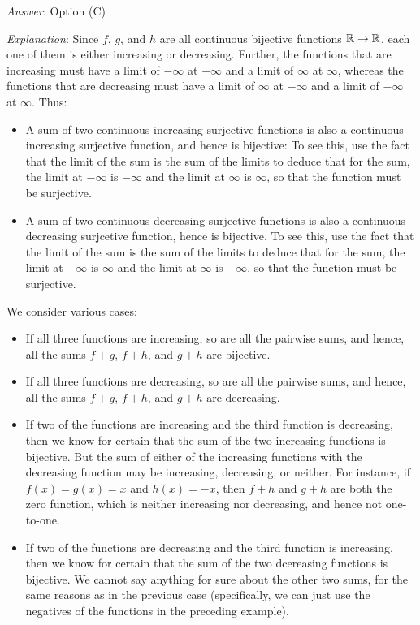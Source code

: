 \documentclass[10pt]{amsart}
\begin{document}
\begin{enumerate}
  {\em Answer}: Option (C)

  {\em Explanation}: Since $f$, $g$, and $h$ are all continuous
  bijective functions $\mathbb{R} \to \mathbb{R}$, each one of them is either
  increasing or decreasing. Further, the functions that are increasing
  must have a limit of $-\infty$ at $-\infty$ and a limit of $\infty$
  at $\infty$, whereas the functions that are decreasing must have a
  limit of $\infty$ at $-\infty$ and a limit of $-\infty$ at
  $\infty$. Thus:

  \begin{itemize}
  \item A sum of two continuous increasing surjective functions is
    also a continuous increasing surjective function, and hence is
    bijective: To see this, use the fact that the limit of the sum is
    the sum of the limits to deduce that for the sum, the limit at
    $-\infty$ is $-\infty$ and the limit at $\infty$ is $\infty$, so
    that the function must be surjective.
  \item A sum of two continuous decreasing surjective functions is
    also a continuous decreasing surjcetive function, hence is
    bijective. To see this, use the fact that the limit of the sum is
    the sum of the limits to deduce that for the sum, the limit at
    $-\infty$ is $\infty$ and the limit at $\infty$ is $-\infty$, so
    that the function must be surjective.
  \end{itemize}

  We consider various cases:

  \begin{itemize}
  \item If all three functions are increasing, so are all the pairwise
    sums, and hence, all the sums $f + g$, $f + h$, and $g + h$ are
    bijective.
  \item If all three functions are decreasing, so are all the pairwise
    sums, and hence, all the sums $f + g$, $f + h$, and $g + h$ are
    decreasing.
  \item If two of the functions are increasing and the third function
    is decreasing, then we know for certain that the sum of the two
    increasing functions is bijective. But the sum of either of the
    increasing functions with the decreasing function may be
    increasing, decreasing, or neither. For instance, if $f(x) = g(x)
    = x$ and $h(x) = -x$, then $f + h$ and $g + h$ are both the zero
    function, which is neither increasing nor decreasing, and hence
    not one-to-one.
  \item If two of the functions are decreasing and the third function
    is increasing, then we know for certain that the sum of the two
    dcereasing functions is bijective. We cannot say anything for sure
    about the other two sums, for the same reasons as in the previous
    case (specifically, we can just use the negatives of the functions
    in the preceding example).
  \end{itemize}


\end{enumerate}
\end{document}
